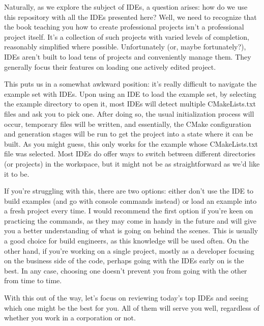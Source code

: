 Naturally, as we explore the subject of IDEs, a question arises: how do we use this repository with all the IDEs presented here? Well, we need to recognize that the book teaching you how to create professional projects isn’t a professional project itself. It’s a collection of such projects with varied levels of completion, reasonably simplified where possible. Unfortunately (or, maybe fortunately?), IDEs aren’t built to load tens of projects and conveniently manage them. They generally focus their features on loading one actively edited project.

This puts us in a somewhat awkward position: it’s really difficult to navigate the example set with IDEs. Upon using an IDE to load the example set, by selecting the example directory to open it, most IDEs will detect multiple CMakeLists.txt files and ask you to pick one. After doing so, the usual initialization process will occur, temporary files will be written, and essentially, the CMake configuration and generation stages will be run to get the project into a state where it can be built. As you might guess, this only works for the example whose CMakeLists.txt file was selected. Most IDEs do offer ways to switch between different directories (or projects) in the workspace, but it might not be as straightforward as we’d like it to be.

If you’re struggling with this, there are two options: either don’t use the IDE to build examples (and go with console commands instead) or load an example into a fresh project every time. I would recommend the first option if you’re keen on practicing the commands, as they may come in handy in the future and will give you a better understanding of what is going on behind the scenes. This is usually a good choice for build engineers, as this knowledge will be used often. On the other hand, if you’re working on a single project, mostly as a developer focusing on the business side of the code, perhaps going with the IDEs early on is the best. In any case, choosing one doesn’t prevent you from going with the other from time to time.

With this out of the way, let’s focus on reviewing today’s top IDEs and seeing which one might be the best for you. All of them will serve you well, regardless of whether you work in a corporation or not.









